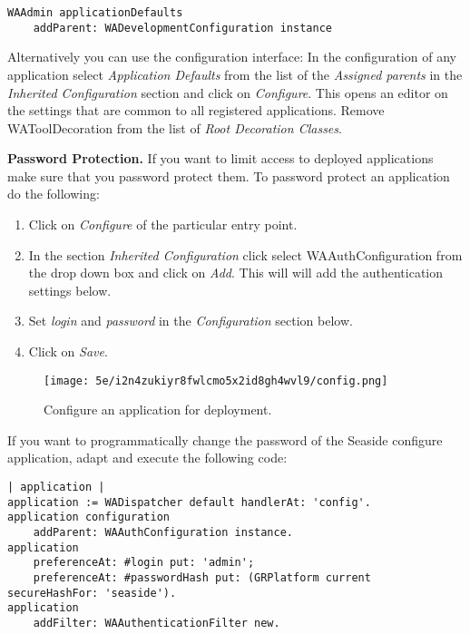 \documentclass[a4paper,10pt,twoside]{book}
\newcommand{\ct}[1]{{\small\ttfamily\textup{#1}}}
\begin{document}
\begin{lstlisting}
WAAdmin applicationDefaults
    addParent: WADevelopmentConfiguration instance
\end{lstlisting}

Alternatively you can use the configuration interface: In the configuration of any application select \textit{Application Defaults} from the list of the \textit{Assigned parents} in the \textit{Inherited Configuration} section and click on \textit{Configure}. This opens an editor on the settings that are common to all registered applications.  Remove \ct{WAToolDecoration} from the list of \textit{Root Decoration Classes}.

\textbf{Password Protection.} If you want to limit access to deployed applications make sure that you password protect them. To password protect an application do the following:

\begin{enumerate}
\item  Click on \textit{Configure} of the particular entry point.
\item  In the section \textit{Inherited Configuration} click select  \ct{WAAuthConfiguration} from the drop down box and click on \textit{Add}. This will will add the authentication settings below.
\item  Set \textit{login} and \textit{password} in the \textit{Configuration} section below.
\item  Click on \textit{Save}.
\end{enumerate}

\begin{figure}[h!tbp]
	\begin{center}
		\texttt{[image: 5e/i2n4zukiyr8fwlcmo5x2id8gh4wvl9/config.png]}
		\caption{Configure an application for deployment.\label{book:advanced:deployment:deploymentpreparing:configurationpng}}
	\end{center}
\end{figure}


If you want to programmatically change the password of the Seaside configure application, adapt and execute the following code:

\begin{lstlisting}
| application |
application := WADispatcher default handlerAt: 'config'.
application configuration 
    addParent: WAAuthConfiguration instance.
application
    preferenceAt: #login put: 'admin';
    preferenceAt: #passwordHash put: (GRPlatform current secureHashFor: 'seaside').
application
    addFilter: WAAuthenticationFilter new.
\end{lstlisting}
\end{document}
